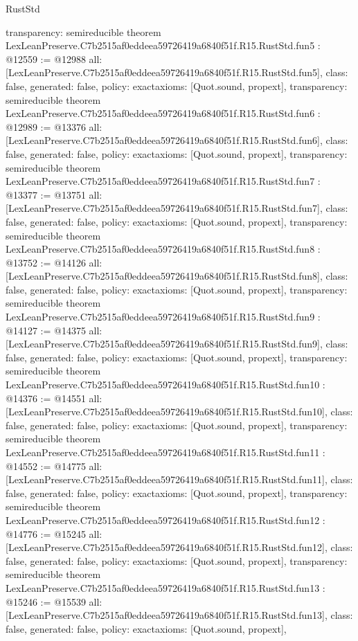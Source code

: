 \begin{lexlean}{RustStd}
\begin{coremodule}
{  transparency: semireducible
}
theorem LexLeanPreserve.C7b2515af0eddeea59726419a6840f51f.R15.RustStd.fun5 : @12559 := @12988 {
  all: [LexLeanPreserve.C7b2515af0eddeea59726419a6840f51f.R15.RustStd.fun5],
  class: false,
  generated: false,
  policy: exact{axioms: [Quot.sound, propext]},
  transparency: semireducible
}
theorem LexLeanPreserve.C7b2515af0eddeea59726419a6840f51f.R15.RustStd.fun6 : @12989 := @13376 {
  all: [LexLeanPreserve.C7b2515af0eddeea59726419a6840f51f.R15.RustStd.fun6],
  class: false,
  generated: false,
  policy: exact{axioms: [Quot.sound, propext]},
  transparency: semireducible
}
theorem LexLeanPreserve.C7b2515af0eddeea59726419a6840f51f.R15.RustStd.fun7 : @13377 := @13751 {
  all: [LexLeanPreserve.C7b2515af0eddeea59726419a6840f51f.R15.RustStd.fun7],
  class: false,
  generated: false,
  policy: exact{axioms: [Quot.sound, propext]},
  transparency: semireducible
}
theorem LexLeanPreserve.C7b2515af0eddeea59726419a6840f51f.R15.RustStd.fun8 : @13752 := @14126 {
  all: [LexLeanPreserve.C7b2515af0eddeea59726419a6840f51f.R15.RustStd.fun8],
  class: false,
  generated: false,
  policy: exact{axioms: [Quot.sound, propext]},
  transparency: semireducible
}
theorem LexLeanPreserve.C7b2515af0eddeea59726419a6840f51f.R15.RustStd.fun9 : @14127 := @14375 {
  all: [LexLeanPreserve.C7b2515af0eddeea59726419a6840f51f.R15.RustStd.fun9],
  class: false,
  generated: false,
  policy: exact{axioms: [Quot.sound, propext]},
  transparency: semireducible
}
theorem LexLeanPreserve.C7b2515af0eddeea59726419a6840f51f.R15.RustStd.fun10 : @14376 := @14551 {
  all: [LexLeanPreserve.C7b2515af0eddeea59726419a6840f51f.R15.RustStd.fun10],
  class: false,
  generated: false,
  policy: exact{axioms: [Quot.sound, propext]},
  transparency: semireducible
}
theorem LexLeanPreserve.C7b2515af0eddeea59726419a6840f51f.R15.RustStd.fun11 : @14552 := @14775 {
  all: [LexLeanPreserve.C7b2515af0eddeea59726419a6840f51f.R15.RustStd.fun11],
  class: false,
  generated: false,
  policy: exact{axioms: [Quot.sound, propext]},
  transparency: semireducible
}
theorem LexLeanPreserve.C7b2515af0eddeea59726419a6840f51f.R15.RustStd.fun12 : @14776 := @15245 {
  all: [LexLeanPreserve.C7b2515af0eddeea59726419a6840f51f.R15.RustStd.fun12],
  class: false,
  generated: false,
  policy: exact{axioms: [Quot.sound, propext]},
  transparency: semireducible
}
theorem LexLeanPreserve.C7b2515af0eddeea59726419a6840f51f.R15.RustStd.fun13 : @15246 := @15539 {
  all: [LexLeanPreserve.C7b2515af0eddeea59726419a6840f51f.R15.RustStd.fun13],
  class: false,
  generated: false,
  policy: exact{axioms: [Quot.sound, propext]},
}
\end{coremodule}
\end{lexlean}
